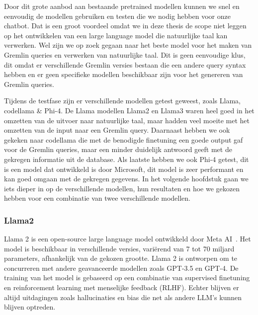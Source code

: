 Door dit grote aanbod aan bestaande pretrained modellen kunnen we snel en eenvoudig de modellen gebruiken en testen die we nodig hebben voor onze chatbot.
Dat is een groot voordeel omdat we in deze thesis de scope niet leggen op het ontwikkelen van een large language model die natuurlijke taal kan verwerken.
Wel zijn we op zoek gegaan naar het beste model voor het maken van Gremlin queries en verwerken van natuurlijke taal. 
Dit is geen eenvoudige klus, dit omdat er verschillende Gremlin versies bestaan die een andere query syntax hebben en er geen specifieke modellen beschikbaar zijn voor het genereren van Gremlin queries.

Tijdens de testfase zijn er verschillende modellen getest geweest, zoals Llama, codellama \& Phi-4.
De Llama modellen Llama2 en Llama3 waren heel goed in het omzetten van de uitvoer naar natuurlijke taal, maar hadden veel moeite met het omzetten van de input naar een Gremlin query.
Daarnaast hebben we ook gekeken naar codellama die met de benodigde finetuning een goede output gaf voor de Gremlin queries, maar een minder duidelijk antwoord geeft met de gekregen informatie uit de database.
Als laatste hebben we ook Phi-4 getest, dit is een model dat ontwikkeld is door Microsoft, dit model is zeer performant en kan goed omgaan met de gekregen gegevens.
In het volgende hoofdstuk gaan we iets dieper in op de verschillende modellen, hun resultaten en hoe we gekozen hebben voor een combinatie van twee verschillende modellen.

\subsubsection{Llama2}
Llama 2 is een open-source large language model ontwikkeld door Meta AI~\autocite{llama2}. 
Het model is beschikbaar in verschillende versies, variërend van 7 tot 70 miljard parameters, afhankelijk van de gekozen grootte.
Llama 2 is ontworpen om te concurreren met andere geavanceerde modellen zoals GPT-3.5 en GPT-4.
De training van het model is gebaseerd op een combinatie van supervised finetuning en reinforcement learning met menselijke feedback (RLHF).
Echter blijven er altijd uitdagingen zoals hallucinaties en bias die net als andere LLM's kunnen blijven optreden.


